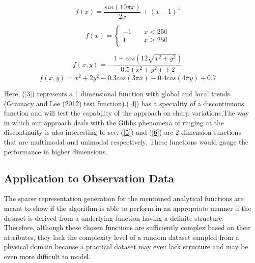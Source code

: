 \documentclass[procedia]{easychair}
\begin{document}

\begin{equation}
f(x)  = \frac{sin(10 \pi x)}{2x} + {(x-1)}^4
\label{3}
\end{equation}

\begin{equation}
f(x) = \left\{
        \begin{array}{ll}
            -1 & \quad x < 250 \\
            1 & \quad x \geq 250
        \end{array}
    \right.
\label{4}
\end{equation}


\begin{equation}
f(x,y) = - \frac{1 + cos(12 \sqrt{x^2 + y^2})}{0.5 (x^2 + y^2)+ 2}
\label{5}
\end{equation}
\begin{equation}
f(x,y) = x^2 + 2y^2 - 0.3cos(3 \pi x) - 0.4cos(4 \pi y) + 0.7
\label{6}
\end{equation}



Here, (\ref{3}) represents a 1 dimensional function with global and local trends (Gramacy and Lee (2012) test function).(\ref{4}) has a speciality of a discontinuous function and will test the capability of the approach on sharp variations.The way in which our approach deals with the Gibbs phenomena of ringing at the discontinuity is also interesting to see. (\ref{5}) and (\ref{6}) are 2 dimension functions that are multimodal and unimodal respectively. These functions would gauge the performance in higher dimensions.



\subsection{Application to Observation Data}

The sparse representation generation for the mentioned analytical functions are meant to show if the algorithm is able to perform in an appropriate manner if the dataset is derived from a underlying function having a definite structure. Therefore, although these chosen functions are sufficiently complex based on their attributes, they lack the complexity level of a random dataset sampled from a physical domain because a practical dataset may even lack structure and may be even more difficult to model. 
\end{document}
